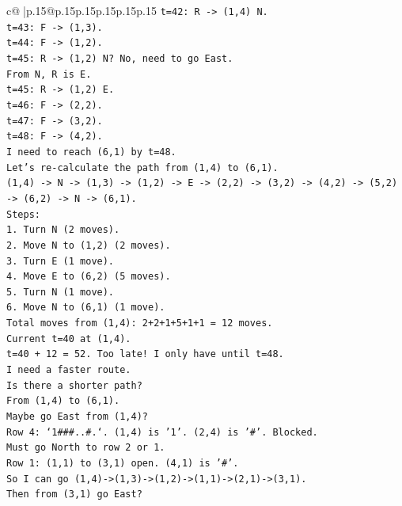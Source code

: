 \documentclass{article}
\begin{document}
{\begin{supertabular}{c@{$\;$}|p{.15\linewidth}@{}p{.15\linewidth}p{.15\linewidth}p{.15\linewidth}p{.15\linewidth}p{.15\linewidth}}
{{{\texttt{t=42: R {-}> (1,4) N.} \\
\texttt{t=43: F {-}> (1,3).} \\
\texttt{t=44: F {-}> (1,2).} \\
\texttt{t=45: R {-}> (1,2) N? No, need to go East.} \\
\texttt{From N, R is E.} \\
\texttt{t=45: R {-}> (1,2) E.} \\
\texttt{t=46: F {-}> (2,2).} \\
\texttt{t=47: F {-}> (3,2).} \\
\texttt{t=48: F {-}> (4,2).} \\
\texttt{I need to reach (6,1) by t=48.} \\
\texttt{Let's re{-}calculate the path from (1,4) to (6,1).} \\
\texttt{(1,4) {-}> N {-}> (1,3) {-}> (1,2) {-}> E {-}> (2,2) {-}> (3,2) {-}> (4,2) {-}> (5,2) {-}> (6,2) {-}> N {-}> (6,1).} \\
\texttt{Steps:} \\
\texttt{1. Turn N (2 moves).} \\
\texttt{2. Move N to (1,2) (2 moves).} \\
\texttt{3. Turn E (1 move).} \\
\texttt{4. Move E to (6,2) (5 moves).} \\
\texttt{5. Turn N (1 move).} \\
\texttt{6. Move N to (6,1) (1 move).} \\
\texttt{Total moves from (1,4): 2+2+1+5+1+1 = 12 moves.} \\
\texttt{Current t=40 at (1,4).} \\
\texttt{t=40 + 12 = 52. Too late! I only have until t=48.} \\
\texttt{I need a faster route.} \\
\texttt{Is there a shorter path?} \\
\texttt{From (1,4) to (6,1).} \\
\texttt{Maybe go East from (1,4)?} \\
\texttt{Row 4: `1\#\#\#..\#.`. (1,4) is '1'. (2,4) is '\#'. Blocked.} \\
\texttt{Must go North to row 2 or 1.} \\
\texttt{Row 1: (1,1) to (3,1) open. (4,1) is '\#'.} \\
\texttt{So I can go (1,4){-}>(1,3){-}>(1,2){-}>(1,1){-}>(2,1){-}>(3,1).} \\
\texttt{Then from (3,1) go East?} \\
}}}
\end{supertabular}}
\end{document}
